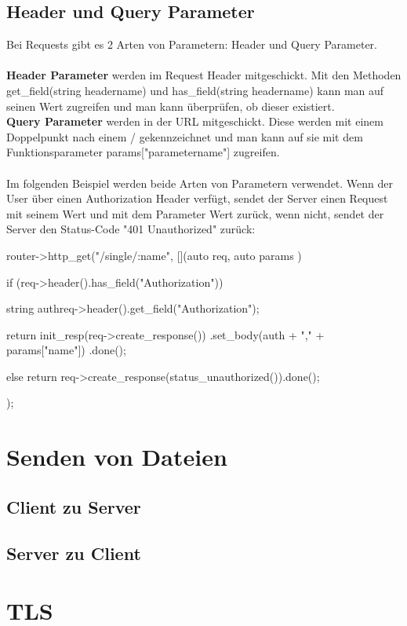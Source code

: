 \documentclass[german,oneside,color]{htldipl}
\begin{document}
\subsection{Header und Query Parameter}
Bei Requests gibt es 2 Arten von Parametern: Header und Query Parameter. 
\\ \\
\textbf{Header Parameter} werden im Request Header mitgeschickt. Mit den Methoden get\_field(string headername) und has\_field(string headername) kann man auf seinen Wert zugreifen und man kann überprüfen, ob dieser existiert.
\\
\textbf{Query Parameter} werden in der URL mitgeschickt. Diese werden mit einem Doppelpunkt nach einem / gekennzeichnet und man kann auf sie mit dem Funktionsparameter params["parametername"] zugreifen.
\\ \\
Im folgenden Beispiel werden beide Arten von Parametern verwendet. Wenn der User über einen Authorization Header verfügt, sendet der Server einen Request mit seinem Wert und mit dem Parameter Wert zurück, wenn nicht, sendet der Server den Status-Code "401 Unauthorized" zurück:
\begin{program}[H]
\begin{JavaCode}
router->http_get("/single/:name", [](auto req, auto params ){
    if (req->header().has_field("Authorization")) {
        string auth{req->header().get_field("Authorization")};    
    
        return init_resp(req->create_response())
               .set_body(auth + "," + params["name"])
               .done();
    } else {
         return req->create_response(status_unauthorized()).done();
    }
});
\end{JavaCode}
\end{program}


\section{Senden von Dateien}
\subsection{Client zu Server}

\subsection{Server zu Client}

\section{TLS}
\end{document}
